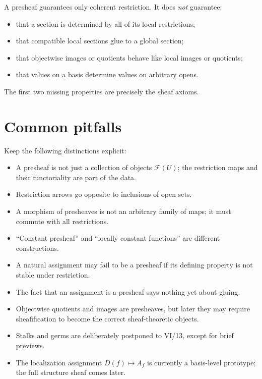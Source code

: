 A presheaf guarantees only coherent restriction.  It does \emph{not} guarantee:

\begin{itemize}
\item that a section is determined by all of its local restrictions;
\item that compatible local sections glue to a global section;
\item that objectwise images or quotients behave like local images or quotients;
\item that values on a basis determine values on arbitrary opens.
\end{itemize}

The first two missing properties are precisely the sheaf axioms.



\section{Common pitfalls}

Keep the following distinctions explicit:
\begin{itemize}
\item A presheaf is not just a collection of objects $\mathcal F(U)$; the restriction maps
      and their functoriality are part of the data.
\item Restriction arrows go opposite to inclusions of open sets.
\item A morphism of presheaves is not an arbitrary family of maps; it must commute with all
      restrictions.
\item ``Constant presheaf'' and ``locally constant functions'' are different constructions.
\item A natural assignment may fail to be a presheaf if its defining property is not stable
      under restriction.
\item The fact that an assignment is a presheaf says nothing yet about gluing.
\item Objectwise quotients and images are presheaves, but later they may require
      sheafification to become the correct sheaf-theoretic objects.
\item Stalks and germs are deliberately postponed to VI/13, except for brief previews.
\item The localization assignment $D(f)\mapsto A_f$ is currently a basis-level prototype;
      the full structure sheaf comes later.
\end{itemize}

